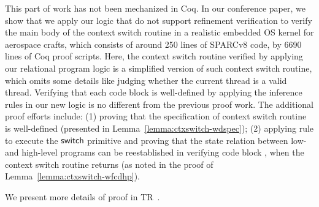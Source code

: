 This part of work has not been mechanized in Coq.
In our conference paper, we show that
we apply our logic that do not support
refinement verification to verify
the main body of the context switch routine in
a realistic embedded OS kernel for aerospace crafts,
which consists of around 250 lines of SPARCv8 code,
by 6690 lines of Coq proof scripts. Here, the
context switch routine verified by applying our
relational program logic is a
simplified version of such context switch routine,
which omits some details like judging whether the
current thread is a valid thread.
Verifying that each code block is well-defined
by applying the inference rules in our new logic is
no different from the previous proof work.
The additional proof efforts include:
(1) proving that the specification of context
switch routine is well-defined (presented in
Lemma~\ref{lemma:ctxswitch-wdspec});
(2) applying  rule to execute
the $\mathsf{switch}$ primitive and proving that the state
relation between low- and high-level programs
can be reestablished in verifying code block
\SwitchNewTask{}, when the context switch routine
returns (as noted in the proof of
Lemma~\ref{lemma:ctxswitch-wfcdhp}).

We present more details of proof in TR~\cite{coqimp}.